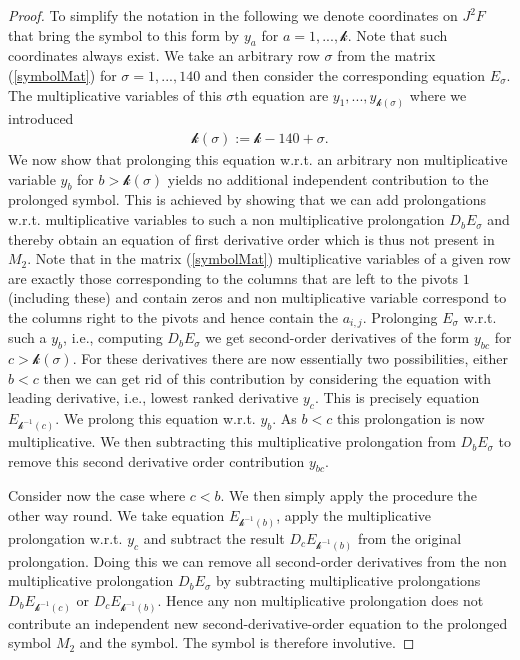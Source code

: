 \begin{proof}
To simplify the notation in the following we denote coordinates on $J^2F$ that bring the symbol to this form by $y_a$ for $a = 1,...,\mathcal{k}$. Note that such coordinates always exist. We take an arbitrary row $\sigma$ from the matrix (\ref{symbolMat}) for $\sigma=1,...,140$ and then consider the corresponding equation $E_{\sigma}$. The multiplicative variables of this $\sigma$th equation are $y_1,...,y_{\mathcal{k}(\sigma)}$ where we introduced 
\begin{align}
\mathcal{k}(\sigma):= \mathcal{k} -140 + \sigma.
\end{align}
We now show that prolonging this equation w.r.t. an arbitrary non multiplicative variable $y_b$ for $b>\mathcal{k}(\sigma)$ yields no additional independent contribution to the prolonged symbol. This is achieved by showing that we can add prolongations w.r.t. multiplicative variables to such a non multiplicative prolongation $D_bE_{\sigma}$ and thereby obtain an equation of first derivative order which is thus not present in $M_2$. Note that in the matrix (\ref{symbolMat}) multiplicative variables of a given row are exactly those corresponding to the columns that are left to the pivots $1$ (including these) and contain zeros and non multiplicative variable correspond to the columns right to the pivots and hence contain the $a_{i,j}$. Prolonging $E_{\sigma}$ w.r.t. such a $y_b$, i.e., computing $D_bE_{\sigma}$ we get second-order derivatives of the form $y_{bc}$ for $c > \mathcal{k}(\sigma) $. For these derivatives there are now essentially two possibilities, either $b<c$ then we can get rid of this contribution by considering the equation with leading derivative, i.e., lowest ranked derivative $y_c$. This is precisely equation $E_{\mathcal{k}^{-1}(c)}$. We prolong this equation w.r.t. $y_b$. As $b<c$ this prolongation is now multiplicative. We then subtracting this multiplicative prolongation from $D_bE_{\sigma}$ to remove this second derivative order contribution $y_{bc}$.

Consider now the case where $c<b$. We then simply apply the procedure the other way round. We take equation $E_{\mathcal{k}^{-1}(b)}$, apply the multiplicative prolongation w.r.t. $y_c$ and subtract the result $D_cE_{\mathcal{k}^{-1}(b)}$ from the original prolongation. Doing this we can remove all second-order derivatives from the non multiplicative prolongation $D_bE_{\sigma}$ by subtracting  multiplicative prolongations $D_bE_{\mathcal{k}^{-1}(c)}$ or $D_cE_{\mathcal{k}^{-1}(b)}$. Hence any non multiplicative prolongation does not contribute an independent new second-derivative-order equation to the prolonged symbol $M_2$ and the symbol. The symbol is therefore involutive. 


\end{proof}
